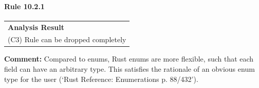 \paragraph{Rule 10.2.1}
\begin{longtable}{p{13cm}}
\textbf{Analysis Result} \\
(C3) Rule can be dropped completely \\
\end{longtable}
\textbf{Comment:} Compared to \Cpp enums, Rust enums are more flexible, such that each field can have an arbitrary type. This satisfies the rationale of an obvious enum type for the user (`Rust Reference: Enumerations p. 88/432'). \\
